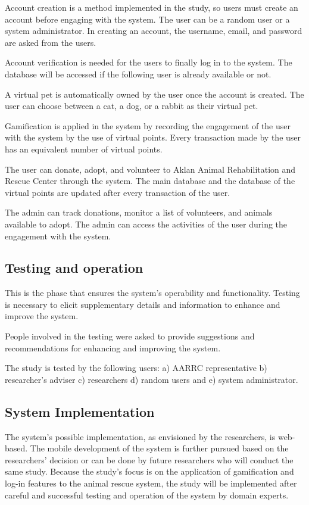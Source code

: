 Account creation is a method implemented in the study, so users must create an account before engaging with the system. The user can be a random user or a system administrator. In creating an account, the username, email, and password are asked from the users. 

Account verification is needed for the users to finally log in to the system. The database will be accessed if the following user is already available or not.

A virtual pet is automatically owned by the user once the account is created. The user can choose between a cat, a dog, or a rabbit as their virtual pet.

Gamification is applied in the system by recording the engagement of the user with the system by the use of virtual points. Every transaction made by the user has an equivalent number of virtual points. 

The user can donate, adopt, and volunteer to Aklan Animal Rehabilitation and Rescue Center through the system. The main database and the database of the virtual points are updated after every transaction of the user. 

The admin can track donations, monitor a list of volunteers, and animals available to adopt. The admin can access the activities of the user during the engagement with the system. 


\subsection{Testing and operation}

This is the phase that ensures the system’s operability and functionality.
Testing is necessary to elicit supplementary details and information to enhance
and improve the system.

People involved in the testing were asked to provide suggestions and recommendations
for enhancing and improving the system.

The study is tested by the following users: a) AARRC representative b) researcher’s
adviser c) researchers d) random users and e) system administrator.

\subsection{System Implementation}

The system’s possible implementation, as envisioned by the researchers, is
web-based. The mobile development of the system is further pursued based on
the researchers’ decision or can be done by future researchers who will conduct the
same study. Because the study’s focus is on the application of gamification and
log-in features to the animal rescue system, the study will be implemented after
careful and successful testing and operation of the system by domain experts.


